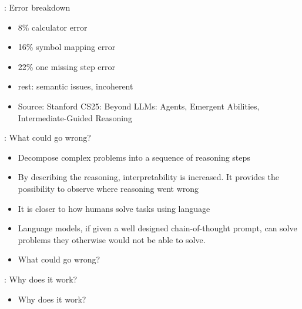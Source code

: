 

\begin{frame}{\cotpfull: Error breakdown}

\vfill

\begin{itemize}
    \item 8\% calculator error
    \item 16\% symbol mapping error
    \item 22\% one missing step error
    \item rest: semantic issues, incoherent \cotp
\item Source: Stanford CS25: Beyond LLMs: Agents, Emergent
    Abilities, Intermediate-Guided Reasoning
\end{itemize}

\vfill

\end{frame}


\begin{frame}{\cotpfull: What could go wrong?}

\vfill

\begin{itemize}
    \item Decompose complex problems into a sequence of reasoning steps
    \item By describing the reasoning, interpretability is increased. It provides the possibility to observe where reasoning went wrong
    \item It is closer to how humans solve tasks using language
    \item Language models, if
given a well designed  chain-of-thought prompt, can
    solve problems they otherwise would not be able to solve.

\item \ques What could go wrong?
\end{itemize}

\vfill

\end{frame}

\begin{frame}{\cotpfull: Why does it work?}

\vfill

\begin{itemize}
    \item \ques Why does it work?
\end{itemize}

\vfill

\end{frame}




